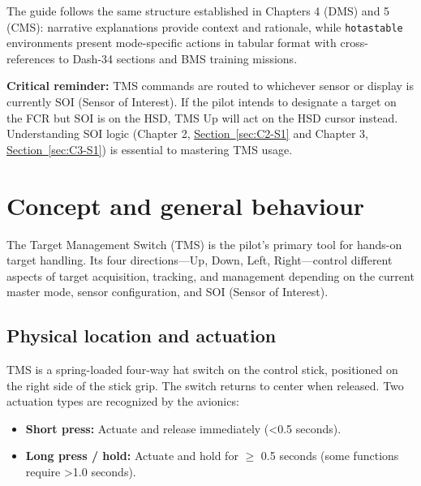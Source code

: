 \documentclass[11pt, a4paper, twoside]{report}
\newcommand{\secref}[1]{\hyperref[#1]{Section~\ref*{#1}}}
\begin{document}
The guide follows the same structure established in Chapters 4 (DMS) and 5 (CMS): narrative explanations provide context and rationale, while \texttt{hotastable} environments present mode-specific actions in tabular format with cross-references to Dash-34 sections and BMS training missions.

\textbf{Critical reminder:} TMS commands are routed to whichever sensor or display is currently SOI (Sensor of Interest). If the pilot intends to designate a target on the FCR but SOI is on the HSD, TMS Up will act on the HSD cursor instead. Understanding SOI logic (Chapter 2, \secref{sec:C2-S1} and Chapter 3, \secref{sec:C3-S1}) is essential to mastering TMS usage.

\newpage
\section{Concept and general behaviour}
\label{sec:C4-S1}

The Target Management Switch (TMS) is the pilot's primary tool for hands-on target handling. Its four directions---Up, Down, Left, Right---control different aspects of target acquisition, tracking, and management depending on the current master mode, sensor configuration, and SOI (Sensor of Interest).

\subsection{Physical location and actuation}
\label{sec:C4-S1-S1}

TMS is a spring-loaded four-way hat switch on the control stick, positioned on the right side of the stick grip. The switch returns to center when released. Two actuation types are recognized by the avionics:

\begin{itemize}
    \item \textbf{Short press:} Actuate and release immediately (<0.5 seconds).
    \item \textbf{Long press / hold:} Actuate and hold for $\geq$ 0.5 seconds (some functions require >1.0 seconds).
\end{itemize}
\end{document}
